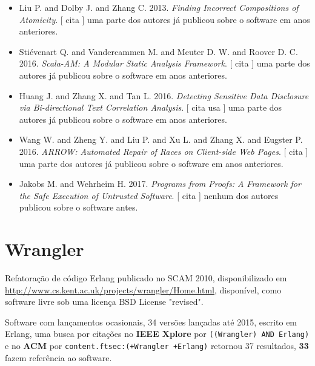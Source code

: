 \begin{itemize}
\item Liu P. and Dolby J. and Zhang C.
      2013.
        \textit{ Finding Incorrect Compositions of Atomicity}.
      [
          cita
      ]
uma parte dos autores já publicou sobre o software em anos anteriores.
\item Stiévenart Q. and Vandercammen M. and Meuter D. W. and Roover D. C.
      2016.
        \textit{ Scala-AM: A Modular Static Analysis Framework}.
      [
          cita
      ]
uma parte dos autores já publicou sobre o software em anos anteriores.
\item Huang J. and Zhang X. and Tan L.
      2016.
        \textit{ Detecting Sensitive Data Disclosure via Bi-directional Text Correlation Analysis}.
      [
          cita
          usa
      ]
uma parte dos autores já publicou sobre o software em anos anteriores.
\item Wang W. and Zheng Y. and Liu P. and Xu L. and Zhang X. and Eugster P.
      2016.
        \textit{ ARROW: Automated Repair of Races on Client-side Web Pages}.
      [
          cita
      ]
uma parte dos autores já publicou sobre o software em anos anteriores.
\item Jakobs M. and Wehrheim H.
      2017.
        \textit{ Programs from Proofs: A Framework for the Safe Execution of Untrusted Software}.
      [
          cita
      ]
nenhum dos autores publicou sobre o software antes.
\end{itemize}
\section{Wrangler}

Refatoração de código Erlang
publicado no SCAM 2010,
disponibilizado em \url{http://www.cs.kent.ac.uk/projects/wrangler/Home.html},
disponível,
como software livre
sob uma licença BSD License "revised".

Software com lançamentos ocasionais,
34 versões lançadas
até 2015,
escrito em Erlang,
uma busca por citações no {\bf IEEE Xplore} por
\texttt{((Wrangler) AND Erlang)}
e no {\bf ACM} por
\texttt{content.ftsec:(+Wrangler +Erlang)}
retornou
37 resultados,
{\bf 33} fazem referência ao software.


